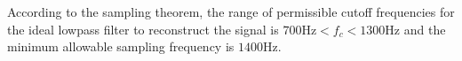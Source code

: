 \documentclass{assignment}
\begin{document}
\begin{sol}
\begin{figure}[h]
        \caption{}
        \label{5}
    \end{figure}
    According to the sampling theorem, the range of permissible cutoff frequencies for the ideal lowpass filter to reconstruct the signal is $700\text{Hz}<f_c<1300$Hz and the minimum allowable sampling frequency is $1400$Hz.
\end{sol}
\end{document}
